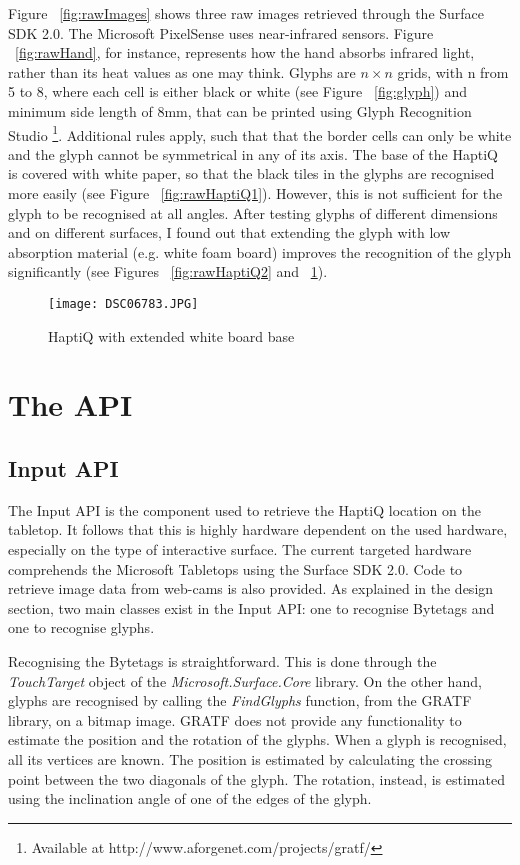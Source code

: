 Figure ~\ref{fig:rawImages} shows three raw images retrieved through the Surface SDK 2.0. The Microsoft PixelSense uses near-infrared sensors. Figure ~\ref{fig:rawHand}, for instance, represents how the hand absorbs infrared light, rather than its heat values as one may think. Glyphs are $n \times n$ grids, with n from 5 to 8, where each cell is either black or white (see Figure  ~\ref{fig:glyph}) and minimum side length of 8mm, that can be printed using Glyph Recognition Studio \footnote{Available at http://www.aforgenet.com/projects/gratf/}. Additional rules apply, such that that the border cells can only be white and the glyph cannot be symmetrical in any of its axis. The base of the HaptiQ is covered with white paper, so that the black tiles in the glyphs are recognised more easily (see Figure ~\ref{fig:rawHaptiQ1}). However, this is not sufficient for the glyph to be recognised at all angles. After testing glyphs of different dimensions and on different surfaces, I found out that extending the glyph with low absorption material (e.g. white foam board) improves the recognition of the glyph significantly (see Figures ~\ref{fig:rawHaptiQ2} and ~\ref{fig:whitesurface}).   

\begin{figure}[H]
  \centering
  \texttt{[image: DSC06783.JPG]}
  \caption{HaptiQ with extended white board base}
  \label{fig:whitesurface}
\end{figure}

\section{The API}

\subsection{Input API}

The Input API is the component used to retrieve the HaptiQ location on the tabletop. It follows that this is highly hardware dependent on the used hardware, especially on the type of interactive surface. The current targeted hardware comprehends the Microsoft Tabletops using the Surface SDK 2.0. Code to retrieve image data from web-cams is also provided. 
As explained in the design section, two main classes exist in the Input API: one to recognise Bytetags and one to recognise glyphs.

Recognising the Bytetags is straightforward. This is done through the \textit{TouchTarget} object of the \textit{Microsoft.Surface.Core} library. On the other hand, glyphs are recognised by calling the \textit{FindGlyphs} function, from the GRATF library, on a bitmap image. GRATF does not provide any functionality to estimate the position and the rotation of the glyphs. When a glyph is recognised, all its vertices are known. The position is estimated by calculating the crossing point between the two diagonals of the glyph. The rotation, instead, is estimated using the inclination angle of one of the edges of the glyph. 

